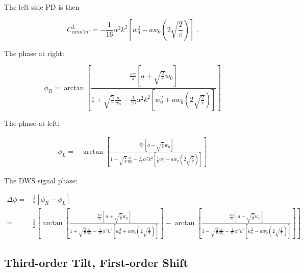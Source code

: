 \documentclass[aps,twoside,secnumarabic,balancelastpage,amsmath,amssymb,nofootinbib,hyperref=pdftex]{revtex4}
\begin{document}
The left side PD is then

\begin{equation*}
C_{nmn'm'}^{L} =
	-\frac{1}{16}
	\alpha^2 k^2 
	[
	  w_0^2
	- 
	a w_0(
	2
	\sqrt{\frac{2}{\pi}}
	)
	]
				 \; .
\end{equation*}

The phase at right:

\begin{equation*}
	\phi_R = 		
			\arctan
				\left[
					\frac
					{ \frac{\pi \alpha}{\lambda}
					\left[
						a 
						+
						\sqrt{\frac{2}{\pi}} w_0
					\right]}					
				{1
				+
				 \sqrt{\frac{2}{\pi}} \frac{a}{w_0}
				 		-\frac{1}{16}\alpha^2 k^2 
	[
	 w_0^2
	+ 
	a w_0(
		2
	\sqrt{\frac{2}{\pi}}
	)
	]			 
				 }
				\right]
\end{equation*}

The phase at left:

\begin{align*}
	\phi_L =&
			\arctan
				\left[
					\frac
					{ \frac{\pi \alpha}{\lambda}
					\left[
						a 
						-
						\sqrt{\frac{2}{\pi}} w_0
					\right]}					
				{1
				-
				 \sqrt{\frac{2}{\pi}} \frac{a}{w_0}
	-\frac{1}{16}
	\alpha^2 k^2 
	[
	 \frac{1}{8} w_0^2
	- 
	a w_0(
	2
	\sqrt{\frac{2}{\pi}}
	)
	]			 
				 }
				\right]
\end{align*}

The DWS signal phase:

\begin{align*}
	\Delta \phi = &
		 \frac{1}{2} 
		 \left[
		 	\phi_R - \phi_L
		 \right]
		 \\ = &
		 \frac{1}{2}
		 \left[
							\arctan
				\left[
					\frac
					{ \frac{\pi \alpha}{\lambda}
					\left[
						a 
						+
						\sqrt{\frac{2}{\pi}} w_0
					\right]}					
				{1
				+
				 \sqrt{\frac{2}{\pi}} \frac{a}{w_0}
				 		-\frac{1}{16}\alpha^2 k^2 
	[
	 w_0^2
	+ 
	a w_0(
		2
	\sqrt{\frac{2}{\pi}}
	)
	]			 
				 }
				\right]
		-
			\arctan
				\left[
					\frac
					{ \frac{\pi \alpha}{\lambda}
					\left[
						a 
						-
						\sqrt{\frac{2}{\pi}} w_0
					\right]}					
				{1
				-
				 \sqrt{\frac{2}{\pi}} \frac{a}{w_0}
	-\frac{1}{16}
	\alpha^2 k^2 
	[
	 w_0^2
	- 
	a w_0(
			2
	\sqrt{\frac{2}{\pi}}
	)
	]			 
				 }
				\right]
			\right]							 	
\end{align*}

\clearpage

\subsection{Third-order Tilt, First-order Shift}
\end{document}
